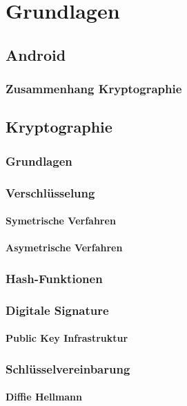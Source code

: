 \documentclass[11pt, a4paper]{scrreprt}
\begin{document}
\part{Grundlagen}
\chapter{Android}
\section{Zusammenhang Kryptographie}

\chapter{Kryptographie}
\section{Grundlagen}
\section{Verschlüsselung}
\subsection{Symetrische Verfahren}
\subsection{Asymetrische Verfahren}

\section{Hash-Funktionen}
\section{Digitale Signature}
\subsection{Public Key Infrastruktur}
\section{Schlüsselvereinbarung}
\subsection{Diffie Hellmann}
\end{document}

